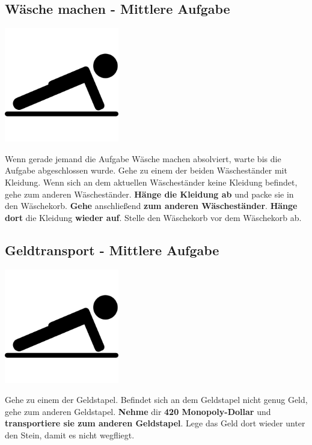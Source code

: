 \subsection{Wäsche machen - Mittlere Aufgabe}
\vfill
\begin{center}
    \includegraphics[height=5cm]{graphics/push_up.png}
\end{center}
\vfill
Wenn gerade jemand die Aufgabe Wäsche machen absolviert, warte bis die Aufgabe
abgeschlossen wurde.
Gehe zu einem der beiden Wäscheständer mit Kleidung.
Wenn sich an dem aktuellen Wäscheständer keine Kleidung befindet, gehe zum
anderen Wäscheständer.
\textbf{Hänge die Kleidung ab} und packe sie in den Wäschekorb.
\textbf{Gehe} anschließend \textbf{zum anderen Wäscheständer}.
\textbf{Hänge dort} die Kleidung \textbf{wieder auf}.
Stelle den Wäschekorb vor dem Wäschekorb ab.
\newline
\newpage

\subsection{Geldtransport - Mittlere Aufgabe}
\vfill
\begin{center}
    \includegraphics[height=5cm]{graphics/push_up.png}
\end{center}
\vfill
Gehe zu einem der Geldstapel.
Befindet sich an dem Geldstapel nicht genug Geld, gehe zum anderen Geldstapel.
\textbf{Nehme} dir \textbf{420 Monopoly-Dollar} und \textbf{transportiere sie
zum anderen Geldstapel}.
Lege das Geld dort wieder unter den Stein, damit es nicht wegfliegt.
\newline
\newpage

